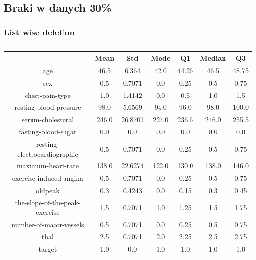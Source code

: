 \documentclass{classrep}
\begin{document}
{{{            }
        }
        \newpage

        \subsection{Braki w danych 30\%}
        \label{results:30-percent} {

            \subsubsection{List wise deletion}
            \label{results:30-percent:list-wise} {

                \begin{table}[!htbp]
                    \centering
                    \begin{tabular}{|c|c|c|c|c|c|c|}
                        \hline
                        & Mean & Std & Mode & Q1 & Median & Q3 \\ \hline
                        age & 46.5 & 6.364 & 42.0 & 44.25 & 46.5 & 48.75 \\ \hline
                        sex & 0.5 & 0.7071 & 0.0 & 0.25 & 0.5 & 0.75 \\ \hline
                        chest-pain-type & 1.0 & 1.4142 & 0.0 & 0.5 & 1.0 & 1.5 \\ \hline
                        resting-blood-pressure & 98.0 & 5.6569 & 94.0 & 96.0 & 98.0 & 100.0 \\ \hline
                        serum-cholestoral & 246.0 & 26.8701 & 227.0 & 236.5 & 246.0 & 255.5 \\ \hline
                        fasting-blood-sugar & 0.0 & 0.0 & 0.0 & 0.0 & 0.0 & 0.0 \\ \hline
                        resting-electrocardiographic & 0.5 & 0.7071 & 0.0 & 0.25 & 0.5 & 0.75 \\ \hline
                        maximum-heart-rate & 138.0 & 22.6274 & 122.0 & 130.0 & 138.0 & 146.0 \\ \hline
                        exercise-induced-angina & 0.5 & 0.7071 & 0.0 & 0.25 & 0.5 & 0.75 \\ \hline
                        oldpeak & 0.3 & 0.4243 & 0.0 & 0.15 & 0.3 & 0.45 \\ \hline
                        the-slope-of-the-peak-exercise & 1.5 & 0.7071 & 1.0 & 1.25 & 1.5 & 1.75 \\ \hline
                        number-of-major-vessels & 0.5 & 0.7071 & 0.0 & 0.25 & 0.5 & 0.75 \\ \hline
                        thal & 2.5 & 0.7071 & 2.0 & 2.25 & 2.5 & 2.75 \\ \hline
                        target & 1.0 & 0.0 & 1.0 & 1.0 & 1.0 & 1.0 \\ \hline
                    \end{tabular}
                    \caption{}
                    \label{result_30_List-wise-deletion}
                \end{table}
                \FloatBarrier

}}}
\end{document}
